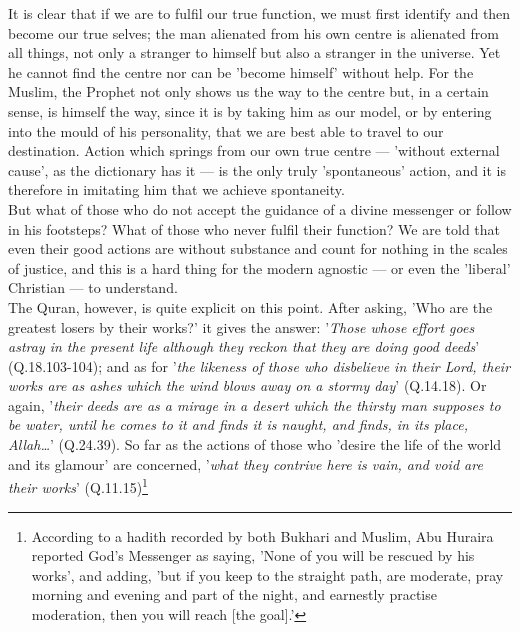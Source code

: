 \documentclass[11pt, b5paper, twoside]{book}
\begin{document}
It is clear that if we are to fulfil our true function, we must first identify and then become our 
true selves; the man alienated from his own centre is alienated from all things, not only a stranger 
to himself but also a stranger in the universe. Yet he cannot find the centre nor can be 'become 
himself' without help. For the Muslim, the Prophet not only shows us the way to the centre but, in a 
certain sense, is himself the way, since it is by taking him as our model, or by entering into the 
mould of his personality, that we are best able to travel to our destination. Action which springs 
from our own true centre --- 'without external cause', as the dictionary has it --- is the only truly 
'spontaneous' action, and it is therefore in imitating him that we achieve spontaneity. \\

But what of those who do not accept the guidance of a divine messenger or follow in his footsteps? 
What of those who never fulfil their function? We are told that even their good actions are without 
substance and count for nothing in the scales of justice, and this is a hard thing for the modern 
agnostic --- or even the 'liberal' Christian --- to understand. \\

The Quran, however, is quite explicit on this point. After asking, 'Who are the greatest losers by 
their works?' it gives the answer: '\emph{Those whose effort goes astray in the present life although they 
reckon that they are doing good deeds}' (Q.18.103-104); and as for '\emph{the likeness of those who 
disbelieve in their Lord, their works are as ashes which the wind blows away on a stormy day}' 
(Q.14.18). Or again, '\emph{their deeds are as a mirage in a desert which the thirsty man supposes to be 
water, until he comes to it and finds it is naught, and finds, in its place, Allah\ldots{}}' (Q.24.39). So 
far as the actions of those who 'desire the life of the world and its glamour' are concerned, '\emph{what 
they contrive here is vain, and void are their works}' (Q.11.15)\footnote{According to a hadith recorded by both Bukhari and Muslim, Abu Huraira reported God's Messenger as 
saying, 'None of you will be rescued by his works', and adding, 'but if you keep to the straight 
path, are moderate, pray morning and evening and part of the night, and earnestly practise 
moderation, then you will reach [the goal].'} \\
\end{document}

